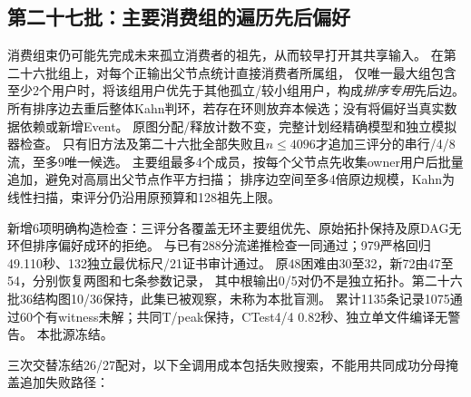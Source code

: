 \documentclass[UTF8,a4paper,11pt,fontset=fandol]{ctexart}
\begin{document}
\subsection{第二十七批：主要消费组的遍历先后偏好}
消费组束仍可能先完成未来孤立消费者的祖先，从而较早打开其共享输入。
在第二十六批组上，对每个正输出父节点统计直接消费者所属组，
仅唯一最大组包含至少2个用户时，将该组用户优先于其他孤立/较小组用户，构成\emph{排序专用}先后边。
所有排序边去重后整体Kahn判环，若存在环则放弃本候选；没有将偏好当真实数据依赖或新增Event。
原图分配/释放计数不变，完整计划经精确模型和独立模拟器检查。
只有旧方法及第二十六批全部失败且$n\le4096$才追加三评分的串行/4/8流，至多9唯一候选。
主要组最多4个成员，按每个父节点先收集owner用户后批量追加，避免对高扇出父节点作平方扫描；
排序边空间至多4倍原边规模，Kahn为线性扫描，束评分仍沿用原预算和128祖先上限。

新增6项明确构造检查：三评分各覆盖无环主要组优先、原始拓扑保持及原DAG无环但排序偏好成环的拒绝。
与已有288分流递推检查一同通过；979严格回归49.110秒、132独立最优标尺/21证书审计通过。
原48困难由30至32，新72由47至54，分别恢复两图和七条参数记录，
其中根输出0/5对仍不是独立拓扑。第二十六批36结构图10/36保持，此集已被观察，未称为本批盲测。
累计1135条记录1075通过60个有witness未解；共同T/peak保持，CTest4/4 0.82秒、独立单文件编译无警告。
本批源冻结。

三次交替冻结26/27配对，以下全调用成本包括失败搜索，不能用共同成功分母掩盖追加失败路径：
\par\smallskip{}\par\smallskip
\end{document}
